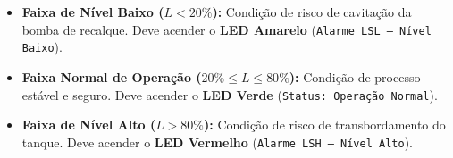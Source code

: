 \documentclass[11pt,a4paper]{article}
\begin{document}
\begin{center}
\begin{minipage}{0.96\textwidth}
\begin{tcolorbox}[colback=lightGray,colframe=ifesNavy,title={\textbf{Definição das Faixas Operacionais de Nível do Tanque (0 a 100\%)}},boxrule=0.7pt]
\small
\begin{itemize}
    \item \textbf{Faixa de Nível Baixo ($L < 20\%$):} Condição de risco de cavitação da bomba de recalque. Deve acender o \textbf{LED Amarelo} (\texttt{Alarme LSL --- Nível Baixo}).
    \item \textbf{Faixa Normal de Operação ($20\% \le L \le 80\%$):} Condição de processo estável e seguro. Deve acender o \textbf{LED Verde} (\texttt{Status: Operação Normal}).
    \item \textbf{Faixa de Nível Alto ($L > 80\%$):} Condição de risco de transbordamento do tanque. Deve acender o \textbf{LED Vermelho} (\texttt{Alarme LSH --- Nível Alto}).
\end{itemize}
\end{tcolorbox}
\end{minipage}
\end{center}
\end{document}
